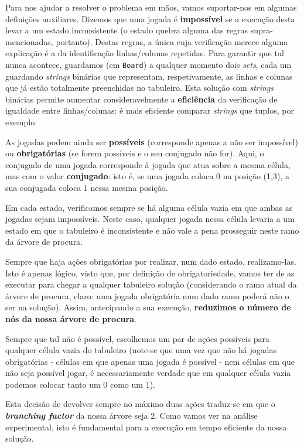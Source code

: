 \documentclass[12pt,a4paper]{article}
\begin{document}
Para nos ajudar a resolver o problema em mãos, vamos suportar-nos em algumas definições auxiliares.
 Dizemos que uma jogada é \textbf{impossível} se a execução desta levar a um estado inconsistente (o estado quebra alguma das regras supra-mencionadas, portanto).
 Destas regras, a única cuja verificação merece alguma explicação é a da identificação linhas/colunas repetidas.
 Para garantir que tal nunca acontece, guardamos (em \texttt{Board}) a qualquer momento dois \textit{sets}, cada um guardando \textit{strings} binárias que representam, respetivamente, as linhas e colunas que já estão totalmente preenchidas no tabuleiro.
 Esta solução com \textit{strings} binárias permite aumentar consideravelmente a \textbf{eficiência} da verificação de igualdade entre linhas/colunas: é mais eficiente comparar \textit{strings} que tuplos, por exemplo.

As jogadas podem ainda ser \textbf{possíveis} (corresponde apenas a não ser impossível) ou \textbf{obrigatórias} (se forem possíveis e o seu conjugado não for).
 Aqui, o conjugado de uma jogada corresponde à jogada que atua sobre a mesma célula, mas com o valor \textbf{conjugado}: isto é, se uma jogada coloca 0 na posição (1,3), a sua conjugada coloca 1 nessa mesma posição.

Em cada estado, verificamos sempre se há alguma célula vazia em que ambas as jogadas sejam impossíveis.
 Neste caso, qualquer jogada nessa célula levaria a um estado em que o tabuleiro é inconsistente e não vale a pena prosseguir neste ramo da árvore de procura.

Sempre que haja ações obrigatórias por realizar, num dado estado, realizamo-las.
 Isto é apenas lógico, visto que, por definição de obrigatoriedade, vamos ter de as executar para chegar a qualquer tabuleiro solução (considerando o ramo atual da árvore de procura, claro: uma jogada obrigatória num dado ramo poderá não o ser na solução).
 Assim, antecipando a sua execução, \textbf{reduzimos o número de nós da nossa árvore de procura}.

Sempre que tal não é possível, escolhemos um par de ações possíveis para qualquer célula vazia do tabuleiro (note-se que uma vez que não há jogadas obrigatórias - células em que apenas uma jogada é possível - nem células em que não seja possível jogar, é necessariamente verdade que em qualquer célula vazia podemos colocar tanto um 0 como um 1).

Esta decisão de devolver sempre no máximo duas ações traduz-se em que o \textbf{\textit{branching factor}} da nossa árvore seja 2.
 Como vamos ver na análise experimental, isto é fundamental para a execução em tempo eficiente da nossa solução.
\end{document}

